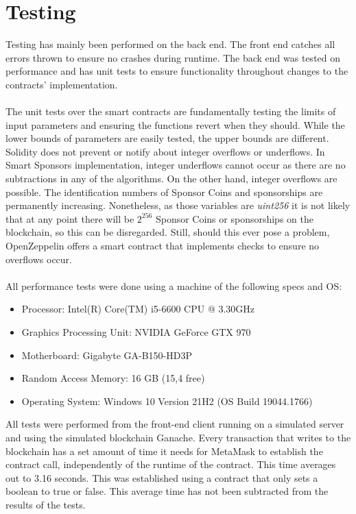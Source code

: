 \section{Testing}
Testing has mainly been performed on the back end. The front end catches all errors thrown to ensure no crashes during runtime. The back end was tested on performance and has unit tests to ensure functionality throughout changes to the contracts' implementation.\\
\\
The unit tests over the smart contracts are fundamentally testing the limits of input parameters and ensuring the functions revert when they should. While the lower bounds of parameters are easily tested, the upper bounds are different. Solidity does not prevent or notify about integer overflows or underflows. In Smart Sponsors implementation, integer underflows cannot occur as there are no subtractions in any of the algorithms. On the other hand, integer overflows are possible. The identification numbers of Sponsor Coins and sponsorships are permanently increasing. Nonetheless, as those variables are \emph{uint256} it is not likely that at any point there will be $2^{256}$ Sponsor Coins or sponsorships on the blockchain, so this can be disregarded. Still, should this ever pose a problem, OpenZeppelin offers a smart contract that implements checks to ensure no overflows occur\cite{Zeppelin}.\\
\\
All performance tests were done using a machine of the following specs and OS:
\begin{itemize}
    \item Processor: Intel(R) Core(TM) i5-6600 CPU @ 3.30GHz
    \item Graphics Processing Unit: NVIDIA GeForce GTX 970
    \item Motherboard: Gigabyte GA-B150-HD3P
    \item Random Access Memory: 16 GB (15,4 free)
    \item Operating System: Windows 10 Version 21H2 (OS Build 19044.1766)
\end{itemize}
All tests were performed from the front-end client running on a simulated server and using the simulated blockchain Ganache\cite{truffle}. Every transaction that writes to the blockchain has a set amount of time it needs for MetaMask to establish the contract call, independently of the runtime of the contract. This time averages out to 3.16 seconds. This was established using a contract that only sets a boolean to true or false. This average time has not been subtracted from the results of the tests.\\
